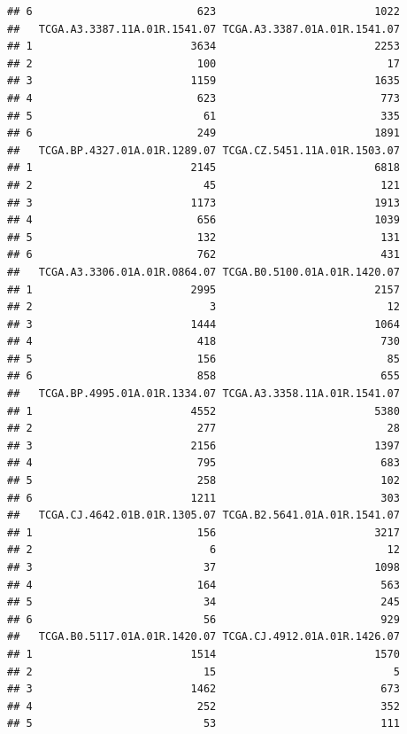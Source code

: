 \documentclass[
]{article}
\begin{document}
\begin{verbatim}
## 6                          623                         1022
##   TCGA.A3.3387.11A.01R.1541.07 TCGA.A3.3387.01A.01R.1541.07
## 1                         3634                         2253
## 2                          100                           17
## 3                         1159                         1635
## 4                          623                          773
## 5                           61                          335
## 6                          249                         1891
##   TCGA.BP.4327.01A.01R.1289.07 TCGA.CZ.5451.11A.01R.1503.07
## 1                         2145                         6818
## 2                           45                          121
## 3                         1173                         1913
## 4                          656                         1039
## 5                          132                          131
## 6                          762                          431
##   TCGA.A3.3306.01A.01R.0864.07 TCGA.B0.5100.01A.01R.1420.07
## 1                         2995                         2157
## 2                            3                           12
## 3                         1444                         1064
## 4                          418                          730
## 5                          156                           85
## 6                          858                          655
##   TCGA.BP.4995.01A.01R.1334.07 TCGA.A3.3358.11A.01R.1541.07
## 1                         4552                         5380
## 2                          277                           28
## 3                         2156                         1397
## 4                          795                          683
## 5                          258                          102
## 6                         1211                          303
##   TCGA.CJ.4642.01B.01R.1305.07 TCGA.B2.5641.01A.01R.1541.07
## 1                          156                         3217
## 2                            6                           12
## 3                           37                         1098
## 4                          164                          563
## 5                           34                          245
## 6                           56                          929
##   TCGA.B0.5117.01A.01R.1420.07 TCGA.CJ.4912.01A.01R.1426.07
## 1                         1514                         1570
## 2                           15                            5
## 3                         1462                          673
## 4                          252                          352
## 5                           53                          111

\end{verbatim}
\end{document}
